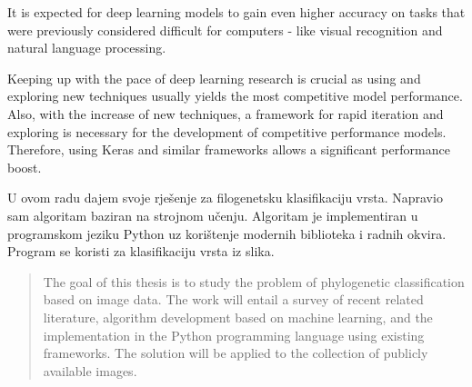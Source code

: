 \documentclass[times, utf8, diplomski]{fer}
\begin{document}
It is expected for deep learning models to gain even higher accuracy on tasks that were previously considered difficult for computers - like visual recognition and natural language processing.  

Keeping up with the pace of deep learning research is crucial as using and exploring new techniques usually yields the most competitive model performance. Also, with the increase of new techniques, a framework for rapid iteration and exploring is necessary for the development of competitive performance models. Therefore, using Keras and similar frameworks allows a significant performance boost.






\begin{sazetak}
U ovom radu dajem svoje rješenje za filogenetsku klasifikaciju vrsta. Napravio sam algoritam baziran na strojnom učenju. Algoritam je implementiran u programskom jeziku Python uz korištenje modernih biblioteka i radnih okvira. Program se koristi za klasifikaciju vrsta iz slika.
 

\end{sazetak}

\begin{abstract}
The goal of this thesis is to study the problem of phylogenetic classification based on image data. The work will entail a survey of recent related literature, algorithm development based on machine learning, and the implementation in the Python programming language using existing frameworks. The solution will be applied to the collection of publicly available images.

\end{abstract}
\end{document}

